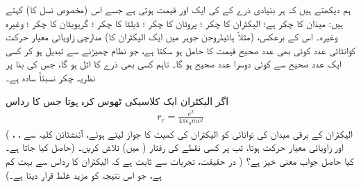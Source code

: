  ہم دیکھتے ہیں کہ ہر بنیادی ذرے کے  کی ایک  اور  قیمت ہوتی ہے جسے اس (مخصوص نسل کا)  کہتے ہیں:  میذان کا چکر  ہے؛ الیکٹران کا چکر ؛ پروٹان کا چکر ؛ ڈیلٹا کا چکر ؛ گریویٹان کا چکر ؛ وغیرہ وغیرہ۔ اس کے برعکس، (مثلاً ہائیڈروجن جوہر میں ایک الیکٹران کا) مدارچی زاویائی معیار حرکت کوانٹائی عدد  کوئی بھی عدد صحیح قیمت کا حامل ہو سکتا ہے، جو نظام چھیڑنے سے تبدیل ہو کر کسی ایک عدد صحیح سے کوئی دوسرا عدد صحیح ہو گا۔ تاہم کسی بھی ذرے کا  اٹل ہو گا، جس کی بنا پر نظریہ چکر نسبتاً سادہ ہے۔ 

اگر الیکٹران ایک کلاسیکی ٹھوس کرہ ہوتا جس کا رداس 
\begin{align}
r_c = \frac{e^2}{4 \pi \epsilon_0 m c ^2}
\end{align}
( الیکٹران کے برقی میدان کی توانائی کو الیکٹران کی کمیت کا جواز لیتے ہوئے، آئنشٹائن کلیہ  سے ، ، حاصل کیا جاتا ہے۔) اور زاویائی معیار حرکت  ہوتا، تب  پر کسی 
نقطے کی رفتار (  میں) تلاش کریں۔ کیا حاصل جواب معنی خیز ہے؟ ( در حقیقت، تجربات سے ثابت ہے کہ الیکٹران کا رداس  سے بہت کم ہے، جو اس نتیجہ کو مزید غلط قرار دیتا ہے۔) 


